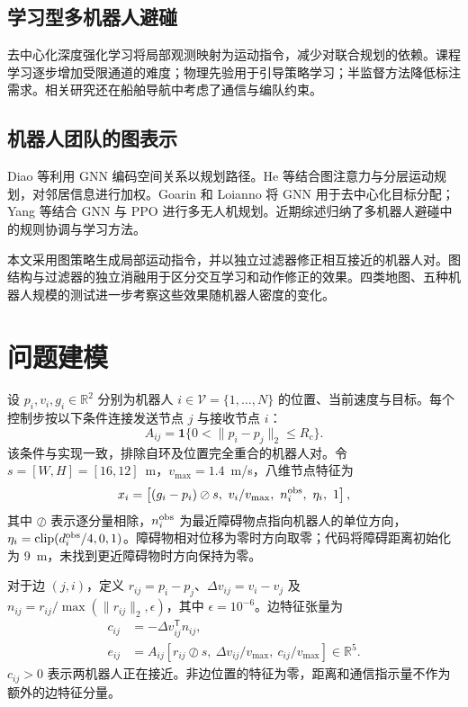 \documentclass[conference]{IEEEtran}
\begin{document}
\subsection{学习型多机器人避碰}
去中心化深度强化学习将局部观测映射为运动指令，减少对联合规划的依赖\cite{long2018orcamarl, thumiger2022uav}。课程学习逐步增加受限通道的难度\cite{komol2025curriculum}；物理先验用于引导策略学习\cite{feng2024physics}；半监督方法降低标注需求\cite{parooei2023semisupervised}。相关研究还在船舶导航中考虑了通信与编队约束\cite{niu2023ship, wang2025ships}。

\subsection{机器人团队的图表示}
Diao 等利用 GNN 编码空间关系以规划路径\cite{diao2024gnn}。He 等结合图注意力与分层运动规划，对邻居信息进行加权\cite{he2023ganav}。Goarin 和 Loianno 将 GNN 用于去中心化目标分配\cite{goarin2024assignment}；Yang 等结合 GNN 与 PPO 进行多无人机规划\cite{yang2025uav}。近期综述归纳了多机器人避碰中的规则协调与学习方法\cite{yang2025survey}。

本文采用图策略生成局部运动指令，并以独立过滤器修正相互接近的机器人对。图结构与过滤器的独立消融用于区分交互学习和动作修正的效果。四类地图、五种机器人规模的测试进一步考察这些效果随机器人密度的变化。

\section{问题建模}

设 $p_i,v_i,g_i\in\mathbb R^2$ 分别为机器人 $i\in\mathcal V=\{1,\ldots,N\}$ 的位置、当前速度与目标。每个控制步按以下条件连接发送节点 $j$ 与接收节点 $i$：
\begin{equation}
A_{ij}=\mathbf{1}\{0<\|p_i-p_j\|_2\le R_c\}.
\end{equation}
该条件与实现一致，排除自环及位置完全重合的机器人对。令 $s=[W,H]=[16,12]$~m，$v_{\max}=1.4$~m/s，八维节点特征为
\begin{equation}
x_i=\left[(g_i-p_i)\oslash s,\ v_i/v_{\max},\ n_i^{\rm obs},\
\eta_i,\ 1\right],
\end{equation}
其中 $\oslash$ 表示逐分量相除，$n_i^{\rm obs}$ 为最近障碍物点指向机器人的单位方向，$\eta_i=\operatorname{clip}(d_i^{\rm obs}/4,0,1)$。障碍物相对位移为零时方向取零；代码将障碍距离初始化为 9~m，未找到更近障碍物时方向保持为零。

对于边 $(j,i)$，定义 $r_{ij}=p_i-p_j$、$\Delta v_{ij}=v_i-v_j$ 及 $n_{ij}=r_{ij}/\max(\|r_{ij}\|_2,\epsilon)$，其中 $\epsilon=10^{-6}$。边特征张量为
\begin{equation}
\begin{aligned}
c_{ij}&=-\Delta v_{ij}^{\mathsf T}n_{ij},\\
e_{ij}&=A_{ij}\left[r_{ij}\oslash s,\ \Delta v_{ij}/v_{\max},\
c_{ij}/v_{\max}\right]\in\mathbb R^5.
\end{aligned}
\end{equation}
$c_{ij}>0$ 表示两机器人正在接近。非边位置的特征为零，距离和通信指示量不作为额外的边特征分量。
\end{document}
